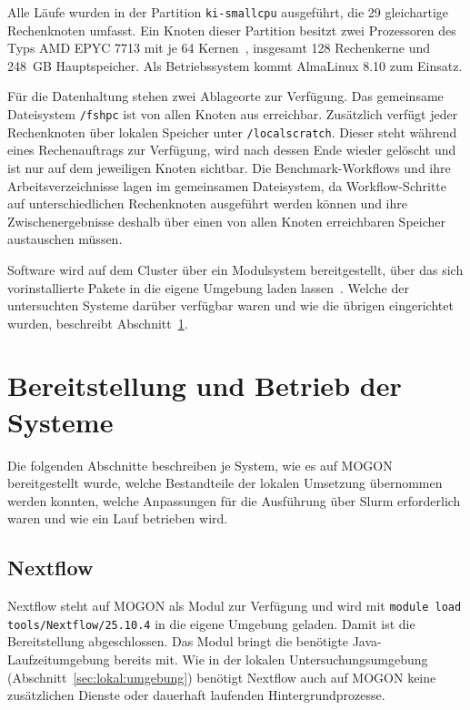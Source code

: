 Alle Läufe wurden in der Partition \texttt{ki-smallcpu} ausgeführt,
die 29 gleichartige Rechenknoten umfasst. Ein Knoten dieser
Partition besitzt zwei Prozessoren des Typs AMD EPYC 7713 mit je 64
Kernen~\cite{mogonnhr}, insgesamt 128 Rechenkerne und 248~GB
Hauptspeicher. Als Betriebssystem kommt AlmaLinux 8.10 zum Einsatz.

Für die Datenhaltung stehen zwei Ablageorte zur Verfügung. Das gemeinsame Dateisystem \texttt{/fshpc} ist von allen Knoten aus
erreichbar. Zusätzlich verfügt jeder Rechenknoten über lokalen Speicher unter
\texttt{/localscratch}. Dieser steht während eines Rechenauftrags
zur Verfügung, wird nach dessen Ende wieder gelöscht und ist nur
auf dem jeweiligen Knoten sichtbar. Die Benchmark-Workflows und ihre Arbeitsverzeichnisse
lagen im gemeinsamen Dateisystem, da Workflow-Schritte auf
unterschiedlichen Rechenknoten ausgeführt werden können und ihre
Zwischenergebnisse deshalb über einen von allen Knoten
erreichbaren Speicher austauschen müssen.

Software wird auf dem Cluster über ein Modulsystem bereitgestellt,
über das sich vorinstallierte Pakete in die eigene Umgebung laden
lassen~\cite{mogondocs}. Welche der untersuchten Systeme darüber
verfügbar waren und wie die übrigen eingerichtet wurden, beschreibt
Abschnitt~\ref{sec:mogon:bereitstellung}.


\section{Bereitstellung und Betrieb der Systeme}
\label{sec:mogon:bereitstellung}

Die folgenden Abschnitte beschreiben je System, wie es auf MOGON
bereitgestellt wurde, welche Bestandteile der lokalen Umsetzung
übernommen werden konnten, welche Anpassungen für die Ausführung
über Slurm erforderlich waren und wie ein Lauf betrieben wird.
\subsection{Nextflow}
\label{sec:mogon:nextflow}

Nextflow steht auf MOGON als Modul zur Verfügung und wird mit
\texttt{module load tools/Nextflow/25.10.4} in die eigene Umgebung
geladen. Damit ist die Bereitstellung abgeschlossen. Das Modul
bringt die benötigte Java-Laufzeitumgebung bereits mit. Wie in der
lokalen Untersuchungsumgebung
(Abschnitt~\ref{sec:lokal:umgebung}) benötigt Nextflow auch auf
MOGON keine zusätzlichen Dienste oder dauerhaft laufenden
Hintergrundprozesse.

